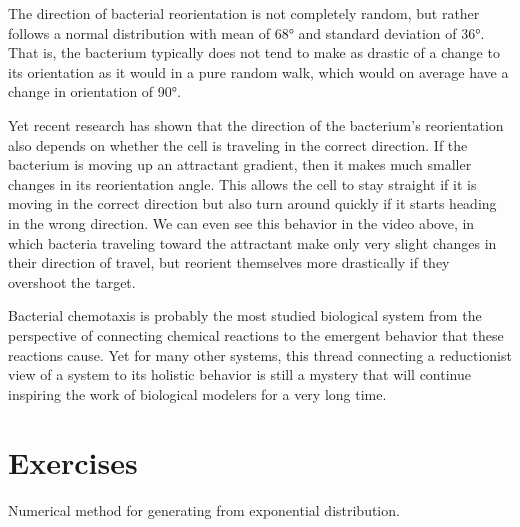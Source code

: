 The direction of bacterial reorientation is not completely random, but rather follows a normal distribution with mean of 68° and standard deviation of 36°. That is, the bacterium typically does not tend to make as drastic of a change to its orientation as it would in a pure random walk, which would on average have a change in orientation of 90°.

Yet recent research has shown that the direction of the bacterium's reorientation also depends on whether the cell is traveling in the correct direction. If the bacterium is moving up an attractant gradient, then it makes much smaller changes in its reorientation angle. This allows the cell to stay straight if it is moving in the correct direction but also turn around quickly if it starts heading in the wrong direction. We can even see this behavior in the video above, in which bacteria traveling toward the attractant make only very slight changes in their direction of travel, but reorient themselves more drastically if they overshoot the target.

Bacterial chemotaxis is probably the most studied biological system from the perspective of connecting chemical reactions to the emergent behavior that these reactions cause. Yet for many other systems, this thread connecting a reductionist view of a system to its holistic behavior is still a mystery that will continue inspiring the work of biological modelers for a very long time.\\

\FloatBarrier
{}
\section{Exercises}
Numerical method for generating from exponential distribution.

